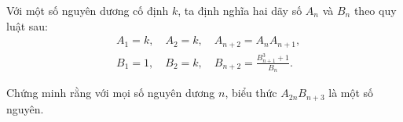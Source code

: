 \ifshowproblem
\begin{problem}\label{example:KOR-2015-MO-P1}
    Với một số nguyên dương cố định \( k \), ta định nghĩa hai dãy số \( A_n \) và \( B_n \) theo quy luật sau:
    \[
        \begin{aligned}
            &A_1 = k,\quad A_2 = k,\quad A_{n+2} = A_n A_{n+1}, \\
            &B_1 = 1,\quad B_2 = k,\quad B_{n+2} = \frac{B_{n+1}^3 + 1}{B_n}.
        \end{aligned}
    \]
    
    Chứng minh rằng với mọi số nguyên dương \( n \), biểu thức \( A_{2n} B_{n+3} \) là một số nguyên.
\end{problem}
\fi

\footnotemark
{}
\fi
